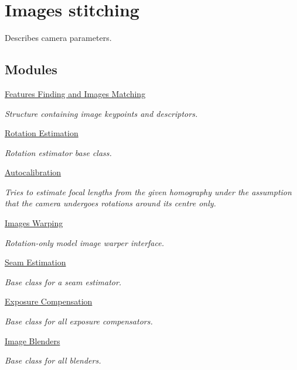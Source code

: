 \hypertarget{group__stitching}{}\section{Images stitching}
\label{group__stitching}


Describes camera parameters.  


\subsection*{Modules}
\begin{DoxyCompactItemize}
\item 
\hyperlink{group__stitching__match}{Features Finding and Images Matching}
\begin{DoxyCompactList}\small\item\em Structure containing image keypoints and descriptors. \end{DoxyCompactList}\item 
\hyperlink{group__stitching__rotation}{Rotation Estimation}
\begin{DoxyCompactList}\small\item\em Rotation estimator base class. \end{DoxyCompactList}\item 
\hyperlink{group__stitching__autocalib}{Autocalibration}
\begin{DoxyCompactList}\small\item\em Tries to estimate focal lengths from the given homography under the assumption that the camera undergoes rotations around its centre only. \end{DoxyCompactList}\item 
\hyperlink{group__stitching__warp}{Images Warping}
\begin{DoxyCompactList}\small\item\em Rotation-\/only model image warper interface. \end{DoxyCompactList}\item 
\hyperlink{group__stitching__seam}{Seam Estimation}
\begin{DoxyCompactList}\small\item\em Base class for a seam estimator. \end{DoxyCompactList}\item 
\hyperlink{group__stitching__exposure}{Exposure Compensation}
\begin{DoxyCompactList}\small\item\em Base class for all exposure compensators. \end{DoxyCompactList}\item 
\hyperlink{group__stitching__blend}{Image Blenders}
\begin{DoxyCompactList}\small\item\em Base class for all blenders. \end{DoxyCompactList}\end{DoxyCompactItemize}

